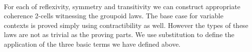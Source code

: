 {\begin{code}
\>[55]\<%
\\
\>[0]\<[9]%
\>[9]  \AgdaSymbol{(} \AgdaSymbol{(} \AgdaSymbol{(} \AgdaInductiveConstructor{,} \AgdaInductiveConstructor{*} \AgdaInductiveConstructor{,} \AgdaInductiveConstructor{*}\AgdaSymbol{)} \AgdaSymbol{)} \AgdaSymbol{(} \AgdaSymbol{(} \AgdaSymbol{(} \AgdaSymbol{(} \AgdaInductiveConstructor{,} \AgdaInductiveConstructor{*} \AgdaInductiveConstructor{,} \AgdaInductiveConstructor{*}\AgdaSymbol{)} \AgdaSymbol{))} \<[90]%
\>[90]\<%
\\
\>[9]\<[11]%
\>[11]\AgdaSymbol{(} \AgdaSymbol{(} \AgdaSymbol{(} \AgdaInductiveConstructor{,} \AgdaInductiveConstructor{*}\AgdaSymbol{)}  \AgdaSymbol{(} \AgdaSymbol{(} \AgdaSymbol{)))} \AgdaSymbol{(} \AgdaSymbol{(} \AgdaSymbol{(} \AgdaInductiveConstructor{,} \AgdaInductiveConstructor{*}\AgdaSymbol{)} \AgdaSymbol{)}\<%
\\
\>[11]\<[17]%
\>[17]\AgdaSymbol{(} \AgdaSymbol{)))))} \<%
\\
%
\\
%
\\
\>\<\end{code}
}
For each of reflexivity, symmetry and transitivity we can construct appropriate coherence 2-cells witnessing the groupoid laws. The base case for variable contexts is proved simply using contractibility as well. However the types of these laws are not as trivial as the proving parts. We use substitution to define the application of the three basic terms we have defined above.

